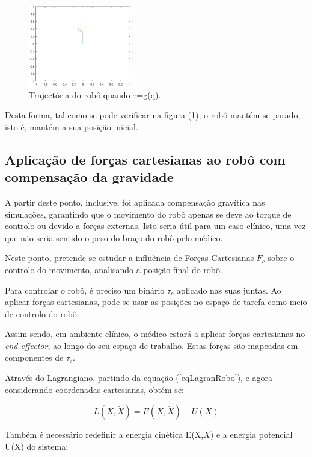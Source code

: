 \documentclass[a4paper,twocolumn,final,11pt]{article}
\let\oldref\ref
\renewcommand{\ref}[1]{(\oldref{#1})}
\begin{document}
\begin{figure}[H]
	\centering
	\includegraphics[width=0.4\textwidth]{5.eps}
	\caption{Trajectória do robô quando $\tau$=g(q).}
  \label{fig8}
\end{figure}

Desta forma, tal como se pode verificar na figura \ref{fig8}, o robô mantém-se parado, isto é, mantém a sua
posição inicial.



\subsection{Aplicação de forças cartesianas ao robô com compensação da gravidade}

A partir deste ponto, inclusive, foi aplicada compensação gravítica nas simulações, garantindo que o movimento do robô apenas se deve ao torque de controlo ou devido a forças externas. Isto seria útil para um caso clínico, uma vez que não seria sentido o peso do braço do robô pelo médico.

Neste ponto, pretende-se estudar a influência de Forças Cartesianas $F_c$ sobre o controlo do movimento, analisando a posição final do robô.

Para controlar o robô, é preciso um binário $\tau_c$ aplicado nas suas juntas. Ao aplicar forças cartesianas, pode-se usar as posições no espaço de tarefa como meio de controlo do robô. 

Assim sendo, em ambiente clínico, o médico estará a aplicar forças cartesianas no \textit{end-effector}, ao longo do seu espaço de trabalho. Estas forças são mapeadas em componentes de $\tau_c$.

Através do Lagrangiano, partindo da equação \ref{eqLagranRobo}, e agora considerando coordenadas cartesianas, obtém-se:

\begin{equation}
    L(X,\dot{X})=E(X,\dot{X})-U(X)
\end{equation}

Também é necessário redefinir a energia cinética E(X,$\dot{X}$) e a energia potencial U(X) do sistema: 
\end{document}
